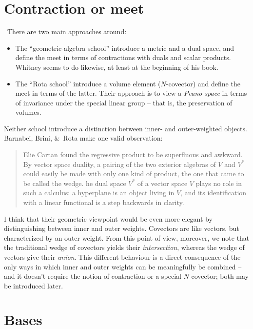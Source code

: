 \documentclass[\ifafour a4paper,12pt,\else a5paper,10pt,\fi%
onecolumn,oneside,article,%
british%
]{memoir}
\theoremstyle{remark}
\theoremstyle{innote}
\newcommand*{\amp}{\&}
\renewcommand*{\|}{\nonscript\,\vert\nonscript\;\mathopen{}}
\newcommand*{\puzzle}{{\fontencoding{U}\fontfamily{fontawesometwo}\selectfont\symbol{225}}}
\newcommand{\mynote}[1]{ {\color{notecolour}\puzzle\ #1}}
\newcommand*{\yN}{N}
\begin{document}
\section{Contraction or meet}
\label{sec:contraction}

\mynote{There are two main approaches around:
  \begin{itemize}
  \item The \enquote{geometric-algebra school} introduce a metric and a
    dual space, and define the meet in terms of contractions with duals and
    scalar products. Whitney seems to do likewise, at least at the
    beginning of his book.
  \item The \enquote{Rota school} introduce a volume element
    ($\yN$-covector) and define the meet in terms of the latter. Their
    approach is to view a \emph{Peano space} in terms of invariance under
    the special linear group -- that is, the preservation of volumes.
  \end{itemize}
  Neither school introduce a distinction between inner- and outer-weighted
  objects. Barnabei, Brini, \amp\ Rota make one valid observation:
  \begin{quote}\small
    Elie Cartan found the regressive product to be superfluous and awkward.
    By vector space duality, a pairing of the two exterior algebras of $V$
    and $V^*$ could easily be made with only one kind of product, the one
    that came to be called the wedge. \textelp{However, T}he dual space
    $V^*$ of a vector space $V$ plays no role in such a calculus: a
    hyperplane is an object living in $V$, and its identification with a
    linear functional is a step backwards in clarity.
  \end{quote}
  I think that their geometric viewpoint would be even more elegant by
  distinguishing between inner and outer weights. Covectors are like
  vectors, but characterized by an outer weight. From this point of view,
  moreover, we note that the traditional wedge of covectors yields their
  \emph{intersection}, whereas the wedge of vectors give their
  \emph{union}. This different behaviour is a direct consequence of the
  only ways in which inner and outer weights can be meaningfully be
  combined -- and it doesn't require the notion of contraction or a special
  $\yN$-covector; both may be introduced later. }



\section{Bases}
\label{sec:bases}
\end{document}
